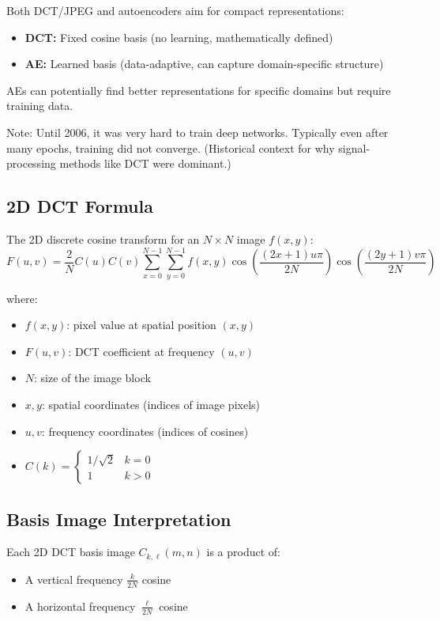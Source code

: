 \documentclass[12pt,a4paper]{article}
\begin{document}
\begin{notebox}
Both DCT/JPEG and autoencoders aim for compact representations:
\begin{itemize}
  \item \textbf{DCT:} Fixed cosine basis (no learning, mathematically defined)
  \item \textbf{AE:} Learned basis (data-adaptive, can capture domain-specific structure)
\end{itemize}
AEs can potentially find better representations for specific domains but require training data.
\end{notebox}

Note: Until 2006, it was very hard to train deep networks. Typically even after many epochs, training did not converge. (Historical context for why signal-processing methods like DCT were dominant.)

\subsection{2D DCT Formula}

The 2D discrete cosine transform for an $N\times N$ image $f(x,y)$:
\[
F(u,v) = \frac{2}{N}C(u)C(v)
  \sum_{x=0}^{N-1}\sum_{y=0}^{N-1}
    f(x,y)
    \cos\!\left(\frac{(2x+1)u\pi}{2N}\right)
    \cos\!\left(\frac{(2y+1)v\pi}{2N}\right)
\]

where:
\begin{itemize}
  \item $f(x,y)$: pixel value at spatial position $(x,y)$
  \item $F(u,v)$: DCT coefficient at frequency $(u,v)$
  \item $N$: size of the image block
  \item $x, y$: spatial coordinates (indices of image pixels)
  \item $u, v$: frequency coordinates (indices of cosines)
  \item $C(k) = \begin{cases} 1/\sqrt{2} & k = 0\\ 1 & k > 0 \end{cases}$
\end{itemize}

\subsection{Basis Image Interpretation}

Each 2D DCT basis image $C_{k,\ell}(m,n)$ is a product of:
\begin{itemize}
  \item A vertical frequency $\frac{k}{2N}$ cosine
  \item A horizontal frequency $\frac{\ell}{2N}$ cosine
\end{itemize}
\end{document}
